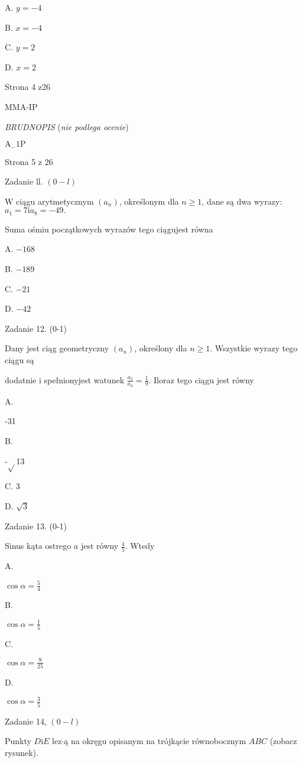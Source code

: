 \documentclass[a4paper,12pt]{article}
\begin{document}
A. $y=-4$

B. $x=-4$

C. $y=2$

D. $x=2$

Strona 4 z26

MMA-IP





{\it BRUDNOPIS} ({\it nie podlega ocenie})

$\mathrm{A}_{-}1\mathrm{P}$

Strona 5 z 26





Zadanie ll. $(0-l)$

$\mathrm{W}$ ciągu arytmetycznym $(a_{n})$, określonym dla $n\geq 1$, dane są dwa wyrazy: $a_{1}=7\mathrm{i}a_{8}=-49.$

Suma ośmiu początkowych wyrazów tego ciągujest równa

A. $-168$

B. $-189$

C. $-21$

D. $-42$

Zadanie 12. (0-1)

Dany jest ciąg geometryczny $(a_{n})$, określony dla $n\geq 1$. Wszystkie wyrazy tego ciągu są

dodatnie i spełnionyjest watunek $\displaystyle \frac{a_{5}}{a_{3}}=\frac{1}{9}$. Iloraz tego ciągu jest równy

A.

-31

B.

-$\sqrt{}$13

C. 3

D. $\sqrt{3}$

Zadanie 13. (0-1)

Sinus kąta ostrego $a$ jest równy $\displaystyle \frac{4}{5}$. Wtedy

A.

$\displaystyle \cos\alpha=\frac{5}{4}$

B.

$\displaystyle \cos\alpha=\frac{1}{5}$

C.

$\displaystyle \cos\alpha=\frac{9}{25}$

D.

$\displaystyle \cos\alpha=\frac{3}{5}$

Zadanie 14, $(0-l)$

Punkty $D\mathrm{i}E$ lez$\cdot$ą na okręgu opisanym na trójkącie równobocznym $ABC$ (zobacz rysunek).
\end{document}
